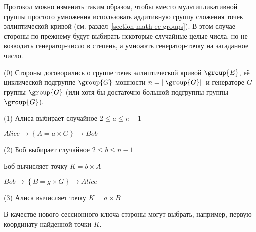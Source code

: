 Протокол можно изменить таким образом, чтобы вместо мультипликативной группы простого умножения использовать аддитивную группу сложения точек эллиптической кривой (см. раздел~\ref{section-math-ec-groups}). В этом случае стороны по прежнему будут выбирать некоторые случайные целые числа, но не возводить генератор-число в степень, а умножать генератор-точку на загаданное число.

\begin{protocol}
    \item[(0)] Стороны договорились о группе точек эллиптической кривой $\group{E}$, её циклической подгруппе $\group{G}$ мощности $n = \| \group{G} \|$ и генераторе $G$ группы $\group{G}$ (или хотя бы достаточно большой подгруппы группы $\group{G}$).
    \item[(1)] Алиса выбирает случайное $2 \leq a \leq n - 1$
    \item[{}] $Alice \to \left\{ A = a \times G \right\} \to Bob$
    \item[(2)] Боб выбирает случайное $2 \leq b \leq n - 1$
    \item[{}] Боб вычисляет точку $K = b \times A$
    \item[{}] $Bob \to \left\{ B = g \times G \right\} \to Alice$
    \item[(3)] Алиса вычисляет точку $K = a \times B$
\end{protocol}

В качестве нового сессионного ключа стороны могут выбрать, например, первую координату найденной точки $K$.

